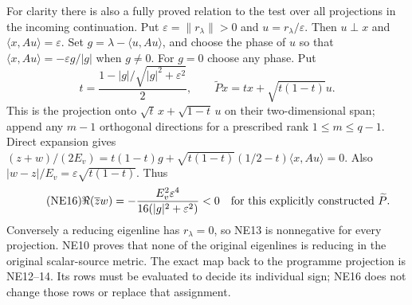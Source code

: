 \documentclass[11pt]{article}
\newcommand{\norm}[1]{\lVert#1\rVert}
\begin{document}
For clarity there is also a fully proved relation to the test over
all projections in the incoming continuation. Put
$\varepsilon=\norm{r_\lambda}>0$ and
$u=r_\lambda/\varepsilon$. Then $u\perp x$ and
$\langle x,Au\rangle=\varepsilon$. Set
$g=\lambda-\langle u,Au\rangle$, and choose the phase of $u$ so that
$\langle x,Au\rangle=-\varepsilon g/|g|$ when $g\ne0$.
For $g=0$ choose any phase. Put
\[
t=\frac{1-|g|/\sqrt{|g|^2+\varepsilon^2}}2,
\qquad \widetilde P x=tx+\sqrt{t(1-t)}u.
\]
This is the projection onto $\sqrt t\,x+\sqrt{1-t}\,u$ on their
two-dimensional span; append any $m-1$ orthogonal directions for a
prescribed rank $1\le m\le q-1$. Direct expansion gives
$(z+w)/(2E_v)=t(1-t)g+\sqrt{t(1-t)}(1/2-t)\langle x,Au\rangle=0$.
Also $|w-z|/E_v=\varepsilon\sqrt{t(1-t)}$. Thus
\begin{equation}\tag{NE16}
\Re(\overline zw)=-\frac{E_v^2\varepsilon^4}
{16(|g|^2+\varepsilon^2)}<0
\quad\hbox{for this explicitly constructed }\widetilde P.
\end{equation}
Conversely a reducing eigenline has $r_\lambda=0$, so NE13 is
nonnegative for every projection. NE10 proves that none of the
original eigenlines is reducing in the original scalar-source metric.
The exact map back to the programme projection is NE12--14. Its rows
must be evaluated to decide its individual sign; NE16 does not change
those rows or replace that assignment.
\end{document}
